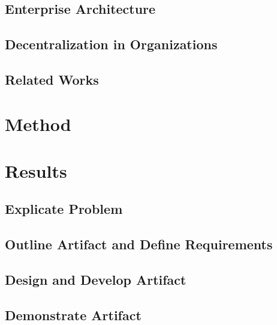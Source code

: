 \documentclass[12pt,
               a4,
               twoside,
               openright]{book} %
\begin{document}
    \section{Enterprise Architecture}
    \label{sec:ea}
    
    
    \section{Decentralization in Organizations}
    \label{sec:organizations}
       
    
    \section{Related Works}
    \label{sec:related}
    
    
    
    \chapter{Method}
    \label{chap:method}
    
    
    
    \chapter{Results}
    \label{chap:results}  
    
    \section{Explicate Problem}    
    \label{sec:exproblem}
    
    
    \section{Outline Artifact and Define Requirements}
    \label{sec:outline}
        
    
    \section{Design and Develop Artifact}
    \label{sec:design}
    
    
    \section{Demonstrate Artifact}
    \label{sec:demo}
      
    
\end{document}
